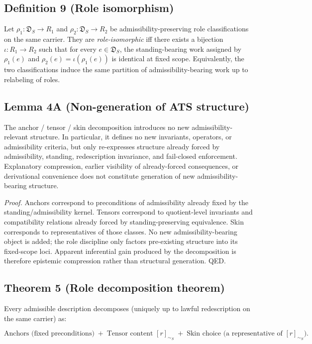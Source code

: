 \documentclass[12pt]{article}
\theoremstyle{plain}
\begin{document}
\subsection{Definition 9 (Role isomorphism)}

Let $\rho_1: \mathfrak{D}_S \to R_1$ and $\rho_2: \mathfrak{D}_S \to R_2$ be admissibility-preserving role classifications on the same carrier. They are \emph{role-isomorphic} iff there exists a bijection $\iota:R_1\to R_2$ such that for every $e\in \mathfrak{D}_S$, the standing-bearing work assigned by $\rho_1(e)$ and $\rho_2(e)=\iota(\rho_1(e))$ is identical at fixed scope. Equivalently, the two classifications induce the same partition of admissibility-bearing work up to relabeling of roles.

\subsection{Lemma 4A (Non-generation of ATS structure)}

The anchor / tensor / skin decomposition introduces no new admissibility-relevant structure. In particular, it defines no new invariants, operators, or admissibility criteria, but only re-expresses structure already forced by admissibility, standing, redescription invariance, and fail-closed enforcement. Explanatory compression, earlier visibility of already-forced consequences, or derivational convenience does not constitute generation of new admissibility-bearing structure.

\textit{Proof.} Anchors correspond to preconditions of admissibility already fixed by the standing/admissibility kernel. Tensors correspond to quotient-level invariants and compatibility relations already forced by standing-preserving equivalence. Skin corresponds to representatives of those classes. No new admissibility-bearing object is added; the role discipline only factors pre-existing structure into its fixed-scope loci. Apparent inferential gain produced by the decomposition is therefore epistemic compression rather than structural generation. QED.

\subsection{Theorem 5 (Role decomposition theorem)}

Every admissible description decomposes (uniquely up to lawful redescription on the same carrier) as:

\[
\boxed{\text{Anchors (fixed preconditions)} \; + \; \text{Tensor content } [r]_{\sim_S} \; + \; \text{Skin choice (a representative of } [r]_{\sim_S}\text{).}}
\]
\end{document}
